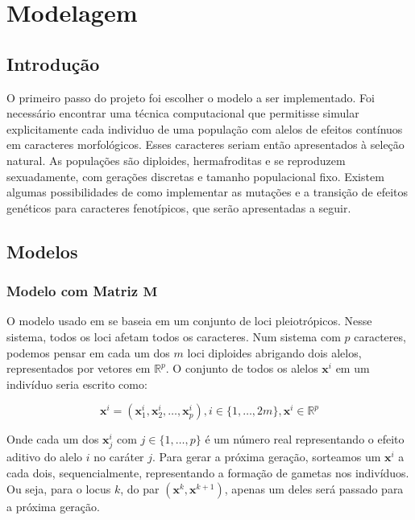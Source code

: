 \pagestyle{empty}
\cleardoublepage
\pagestyle{fancy}
\chapter{Modelagem}\label{cap2}

\section{Introdução}\label{cap2:intro}

O primeiro passo do projeto foi escolher o modelo a ser implementado.
Foi necessário encontrar uma técnica computacional que permitisse
simular explicitamente cada individuo de uma população com alelos de efeitos
contínuos em caracteres morfológicos.
Esses caracteres seriam então apresentados à seleção natural.
As populações são diploides, hermafroditas e se reproduzem sexuadamente,
com gerações discretas e tamanho populacional fixo.
Existem algumas possibilidades de como implementar as mutações e
a transição de efeitos genéticos para caracteres fenotípicos, que serão
apresentadas a seguir.

\section{Modelos}\label{cap2:mem}

\subsection{Modelo com Matriz $\mathbf{M}$}\label{cap2:mem:ModelM}

O modelo usado em \cite{Jones2003, Jones2004, Jones2007} se baseia em um
conjunto de loci pleiotrópicos.
Nesse sistema, todos os loci afetam todos os caracteres.
Num sistema com $p$ caracteres, podemos pensar em cada um dos $m$ loci
diploides abrigando dois alelos, representados por vetores em
$\mathbb{R}^p$.
O conjunto de todos os alelos $\mathbf{x}^i$ em um indivíduo seria
escrito como:

\begin{equation}
\mathbf{x}^i = ( \mathbf{x}^i_1, \mathbf{x}^i_2,\ldots, \mathbf{x}^i_p), i \in \{1,\ldots, 2m\}, \mathbf{x}^i \in \mathbb{R}^p
\end{equation}

Onde cada um dos $\mathbf{x}^i_j$ com $j \in \{1,\ldots, p\}$ é um número real
representando o efeito aditivo do alelo $i$ no caráter $j$.
Para gerar a próxima geração, sorteamos um $\mathbf{x}^i$ a cada dois,
sequencialmente, representando a formação de gametas nos indivíduos.
Ou seja, para o locus $k$, do par $(\mathbf{x}^{k},\mathbf{x}^{k+1})$,
apenas um deles será passado para a próxima geração.

